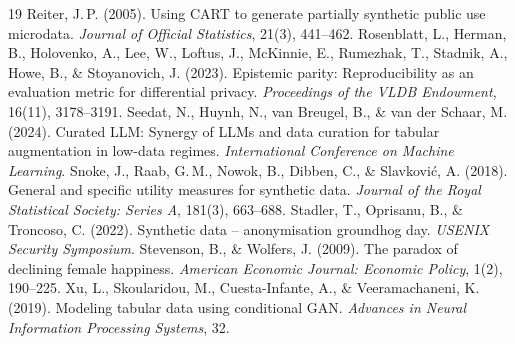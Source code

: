 \documentclass[10pt]{article}
\begin{document}
\begin{thebibliography}{19}
 Reiter, J.\,P. (2005). Using CART to generate partially synthetic public
  use microdata. \emph{Journal of Official Statistics}, 21(3), 441--462.
 Rosenblatt, L., Herman, B., Holovenko, A., Lee, W.,
  Loftus, J., McKinnie, E., Rumezhak, T., Stadnik, A., Howe, B., \& Stoyanovich, J. (2023). Epistemic
  parity: Reproducibility as an evaluation metric for differential privacy. \emph{Proceedings of the VLDB
  Endowment}, 16(11), 3178--3191.
 Seedat, N., Huynh, N., van Breugel, B., \& van der Schaar, M.
  (2024). Curated LLM: Synergy of LLMs and data curation for tabular augmentation in low-data regimes.
  \emph{International Conference on Machine Learning}.
 Snoke, J., Raab, G.\,M., Nowok, B., Dibben, C., \& Slavkovi\'c, A.
  (2018). General and specific utility measures for synthetic data. \emph{Journal of the Royal
  Statistical Society: Series A}, 181(3), 663--688.
 Stadler, T., Oprisanu, B., \& Troncoso, C. (2022). Synthetic
  data -- anonymisation groundhog day. \emph{USENIX Security Symposium}.
 Stevenson, B., \& Wolfers, J. (2009). The paradox of
  declining female happiness. \emph{American Economic Journal: Economic Policy}, 1(2), 190--225.
 Xu, L., Skoularidou, M., Cuesta-Infante, A., \& Veeramachaneni, K.
  (2019). Modeling tabular data using conditional GAN. \emph{Advances in Neural Information Processing
  Systems}, 32.
\end{thebibliography}
\endgroup
\end{document}
